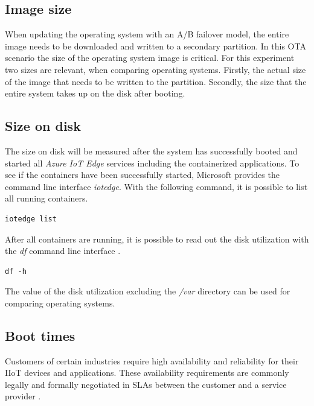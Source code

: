 \subsection{Image size}
When updating the operating system with an A/B failover model, the entire
image needs to be downloaded and written to a secondary partition. In this
\ac{OTA} scenario the size of the operating system image is critical.
For this experiment two sizes are relevant, when comparing operating systems.
Firstly, the actual size of the image that needs to be written to the partition.
Secondly, the size that the entire system takes up on the disk after booting.

\subsection{Size on disk}
The size on disk will be measured after the system has successfully booted
and started all \textit{Azure IoT Edge} services including the containerized
applications. To see if the containers have been successfully started,
Microsoft provides the command line interface \textit{iotedge}.
With the following command, it is possible to list all running containers.\\

\begin{lstlisting}[caption=Command to retrieve the status of all containers]
iotedge list
\end{lstlisting}
After all containers are running, it is possible to read out the disk utilization
with the \textit{df} command line interface \cite{man-df}.\\

\begin{lstlisting}[caption=Command to report file system space usage]
df -h
\end{lstlisting}
The value of the disk utilization excluding the \textit{/var} directory
can be used for comparing operating systems.

\subsection{Boot times}
Customers of certain industries require high availability and reliability for
their \ac{IIoT} devices and applications. These availability requirements
are commonly legally and formally negotiated in \ac{SLA}s between
the customer and a service provider \cite{msdoc-slas}.


